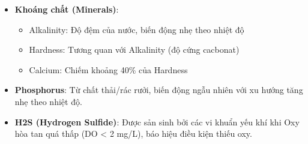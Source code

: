 \begin{itemize}
    \item \textbf{Khoáng chất (Minerals)}:
    \begin{itemize}
        \item Alkalinity: Độ đệm của nước, biến động nhẹ theo nhiệt độ
        \item Hardness: Tương quan với Alkalinity (độ cứng cacbonat)
        \item Calcium: Chiếm khoảng 40\% của Hardness
    \end{itemize}
    
    \item \textbf{Phosphorus}: Từ chất thải/rác rưởi, biến động ngẫu nhiên với xu hướng tăng nhẹ theo nhiệt độ.
    
    \item \textbf{H2S (Hydrogen Sulfide)}: Được sản sinh bởi các vi khuẩn yếu khí khi Oxy hòa tan quá thấp (DO < 2 mg/L), báo hiệu điều kiện thiếu oxy.
\end{itemize}

